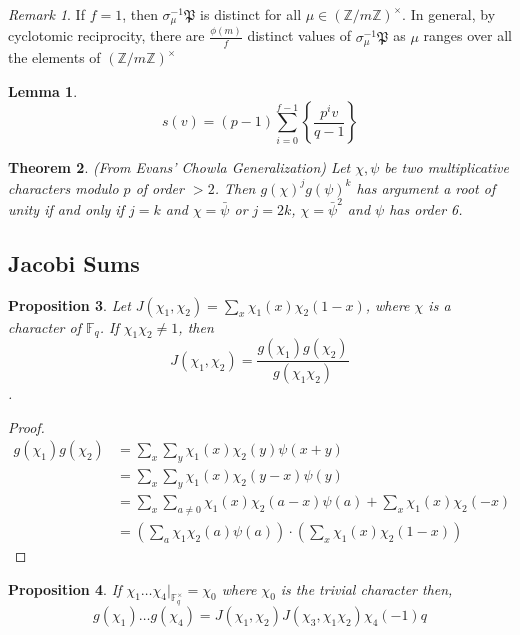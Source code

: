 \documentclass{article}
\newcommand{\Z}{\mathbb{Z}}
\newcommand{\F}{\mathbb{F}}
\newcommand{\finunits}[1]{\mathbb{F}_{#1}^\times}
\newtheorem{theorem}{Theorem}[section]
\newtheorem{lemma}[theorem]{Lemma}
\newtheorem{proposition}[theorem]{Proposition}
\theoremstyle{definition}
\theoremstyle{definition}
\theoremstyle{remark}
\newtheorem*{remark}{Remark}
\begin{document}
\begin{remark} If $f = 1$, then $\sigma_{\mu}^{-1} \mathfrak{P}$ is distinct for all $\mu\in(\Z/m\Z)^{\times}$. In general, by cyclotomic reciprocity, there are $\frac{\phi(m)}{f}$ distinct values of $\sigma_{\mu}^{-1} \mathfrak{P}$ as $\mu$ ranges over all the elements of $(\Z/m\Z)^{\times}$
\end{remark}

\begin{lemma}
\[ s\left( v \right) = (p-1) \sum_{i = 0}^{f-1} \left\{ \frac{p^i v}{q - 1} \right\} \]
\end{lemma}

\begin{theorem} \label{thm:evans_product_root}(From Evans' Chowla Generalization) Let $\chi, \psi$ be two multiplicative characters modulo $p$ of order $> 2$. Then $g(\chi)^jg(\psi)^k$ has argument a root of unity if and only if $j = k$ and $\chi = \bar{\psi}$ or $j = 2k$, $\chi = \bar{\psi}^2$ and $\psi$ has order 6.
\end{theorem}

\subsection{Jacobi Sums}

\begin{proposition}
Let $J(\chi_1, \chi_2) = \sum_x \chi_1(x) \chi_2(1-x)$, where $\chi$ is a character of $\F_q$. If $\chi_1\chi_2 \ne 1$, then 
\[J(\chi_1, \chi_2) = \frac{g(\chi_1)g(\chi_2)}{g(\chi_1\chi_2)}\].
\end{proposition}
\begin{proof} 
\begin{align*}
g(\chi_1)g(\chi_2) &= \sum_x\sum_y \chi_1(x)\chi_2(y) \psi(x+y) \\
&= \sum_x \sum_y \chi_1(x)\chi_2(y-x)\psi(y) \\ 
&= \sum_x \sum_{a \ne 0} \chi_1(x)\chi_2(a-x)\psi(a) + \sum_x \chi_1(x)\chi_2(-x) \\ &= (\sum_a \chi_1\chi_2(a) \psi(a)) \cdot (\sum_x \chi_1(x)\chi_2(1-x)) 
\end{align*}
\end{proof}

\begin{proposition}
If $\chi_1 \dots \chi_4 |_{\finunits{q}} = \chi_0$ where $\chi_0$ is the trivial character then, \[g(\chi_1) \dots g(\chi_4) = J(\chi_1, \chi_2)J(\chi_3,\chi_1\chi_2) \chi_4(-1)q\]
\end{proposition}
\end{document}
